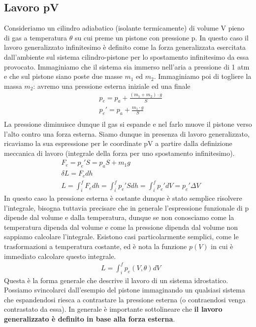\documentclass[10pt,a4paper]{article}
\begin{document}
\subsection{Lavoro pV}
Consideriamo un cilindro adiabatico (isolante termicamente) di volume V pieno di gas a temperatura $\theta$ su cui preme un pistone con pressione p. In questo caso il lavoro generalizzato infinitesimo è definito come la forza generalizzata esercitata dall'ambiente sul sistema cilindro-pistone per lo spostamento infinitesimo da essa provocato. Immaginiamo che il sistema sia immerso nell'aria a pressione di 1 atm e che sul pistone siano poste due masse $m_1$ ed $m_2$. Immaginiamo poi di togliere la massa $m_2$: avremo una pressione esterna iniziale ed una finale
\begin{align*}
&p_e=p_a+\frac{(m_1+m_2)\cdot g}{S}\\
&p_e'=p_a+\frac{m_1\cdot g}{S}\\
\end{align*}
La pressione diminuisce dunque il gas si espande e nel farlo muove il pistone verso l'alto contro una forza esterna. Siamo dunque in presenza di lavoro generalizzato, ricaviamo la sua espressione per le coordinate pV a partire dalla definizione meccanica di lavoro (integrale della forza per uno spostamento infinitesimo). 
\begin{align*}
	&F_e = p_e' S = p_a S + m_1 g\\
	&\delta L = F_e dh\\
	&L= \int_{i}^{f}F_e dh = \int_{i}^{f} p_e' S dh = \int_{i}^{f} p_e' dV = p_e' \Delta V
\end{align*}
In questo caso la pressione esterna è costante dunque è stato semplice risolvere l'integrale, bisogna tuttavia precisare che in generale l'espressione funzionale di p dipende dal volume e dalla temperatura, dunque se non conosciamo come la temperatura dipenda dal volume e come la pressione dipenda dal volume non sappiamo calcolare l'integrale. Esistono casi particolarmente semplici, come le trasformazioni a temperatura costante, ed è nota la funzione $p(V)$ in cui è immediato calcolare questo integrale.
\begin{align*}
	&L= \int_{i}^{f} p_e(V,\theta) dV
\end{align*}
Questa è la forma generale che descrive il lavoro di un sistema idrostatico. Possiamo svincolarci dall'esempio del pistone immaginando un qualsiasi sistema che espandendosi riesca a contrastare la pressione esterna (o contraendosi venga contrastato da essa). In generale è importante sottolineare che \textbf{il lavoro generalizzato è definito in base alla forza esterna}. \\
\end{document}
